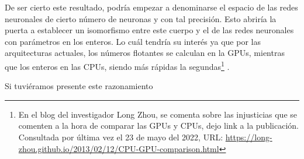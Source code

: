 De ser cierto este resultado, podría empezar a denominarse el espacio 
de las redes neuronales de cierto número de neuronas y con tal
precisión. Esto abriría la puerta a establecer un isomorfismo entre este cuerpo y el de las redes neuronales con parámetros en los 
enteros.  Lo cuál tendría su interés ya que por las arquitecturas 
actuales, los números flotantes se calculan en la GPUs, mientras que los enteros en las CPUs, siendo más rápidas la segundas\footnote{En el blog del investigador Long Zhou, se comenta sobre las injusticias que se comenten a la hora de comparar las GPUs y CPUs, dejo link a la publicación. Consultada por última vez el 23 de mayo
del 2022, URL: \url{https://long-zhou.github.io/2013/02/12/CPU-GPU-comparison.html}} \cite{CPU-vs-GPUS}. 

Si tuviéramos presente este razonamiento 


